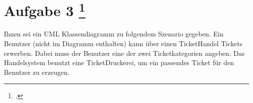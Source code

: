 \documentclass{lehramt-informatik-aufgabe}
\begin{document}
\let\j=\liJavaCode

\section{Aufgabe 3
\footcite{66116:2020:09}}






Ihnen sei ein UML Klassendiagramm zu folgendem Szenario gegeben. Ein
Benutzer (nicht im Diagramm enthalten) kann über einen TicketHandel
Tickets erwerben. Dabei muss der Benutzer eine der zwei Ticketkategorien
angeben. Das Handelsystem benutzt eine TicketDruckerei, um ein passendes
Ticket für den Benutzer zu erzeugen.
\end{document}
